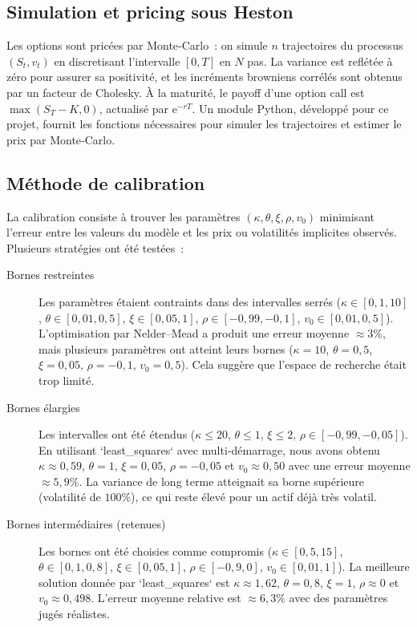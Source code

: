 \documentclass[12pt,a4paper]{article}
\begin{document}
\subsection{Simulation et pricing sous Heston}

Les options sont pricées par Monte‑Carlo : on simule $n$ trajectoires du processus $(S_t,v_t)$ en discretisant l'intervalle $[0,T]$ en $N$ pas.  La variance est reflétée à zéro pour assurer sa positivité, et les incréments browniens corrélés sont obtenus par un facteur de Cholesky.  À la maturité, le payoff d'une option call est $\max(S_T-K,0)$, actualisé par $\mathrm{e}^{-rT}$.  Un module Python, développé pour ce projet, fournit les fonctions nécessaires pour simuler les trajectoires et estimer le prix par Monte‑Carlo.

\subsection{Méthode de calibration}

La calibration consiste à trouver les paramètres $(\kappa,\theta,\xi,\rho,v_0)$ minimisant l'erreur entre les valeurs du modèle et les prix ou volatilités implicites observés.  Plusieurs stratégies ont été testées :

\begin{description}
  \item[Bornes restreintes] Les paramètres étaient contraints dans des intervalles serrés ($\kappa\in[0{,}1,10]$, $\theta\in[0{,}01,0{,}5]$, $\xi\in[0{,}05,1]$, $\rho\in[-0{,}99,-0{,}1]$, $v_0\in[0{,}01,0{,}5]$).  L'optimisation par Nelder--Mead a produit une erreur moyenne $\approx3\%$, mais plusieurs paramètres ont atteint leurs bornes ($\kappa=10$, $\theta=0{,}5$, $\xi=0{,}05$, $\rho=-0{,}1$, $v_0=0{,}5$). Cela suggère que l’espace de recherche était trop limité.
  \item[Bornes élargies] Les intervalles ont été étendus ($\kappa\le20$, $\theta\le1$, $\xi\le2$, $\rho\in[-0{,}99,-0{,}05]$).  En utilisant `least\_squares` avec multi‑démarrage, nous avons obtenu $\kappa\approx0{,}59$, $\theta=1$, $\xi=0{,}05$, $\rho=-0{,}05$ et $v_0\approx0{,}50$ avec une erreur moyenne $\approx5,9\%$.  La variance de long terme atteignait sa borne supérieure (volatilité de $100$\%), ce qui reste élevé pour un actif déjà très volatil.
  \item[Bornes intermédiaires (retenues)] Les bornes ont été choisies comme compromis ($\kappa\in[0{,}5,15]$, $\theta\in[0{,}1,0{,}8]$, $\xi\in[0{,}05,1]$, $\rho\in[-0{,}9,0]$, $v_0\in[0{,}01,1]$).  La meilleure solution donnée par `least\_squares` est $\kappa\approx1{,}62$, $\theta=0{,}8$, $\xi=1$, $\rho\approx0$ et $v_0\approx0{,}498$.  L'erreur moyenne relative est $\approx6{,}3\%$ avec des paramètres jugés réalistes.
\end{description}
\end{document}
